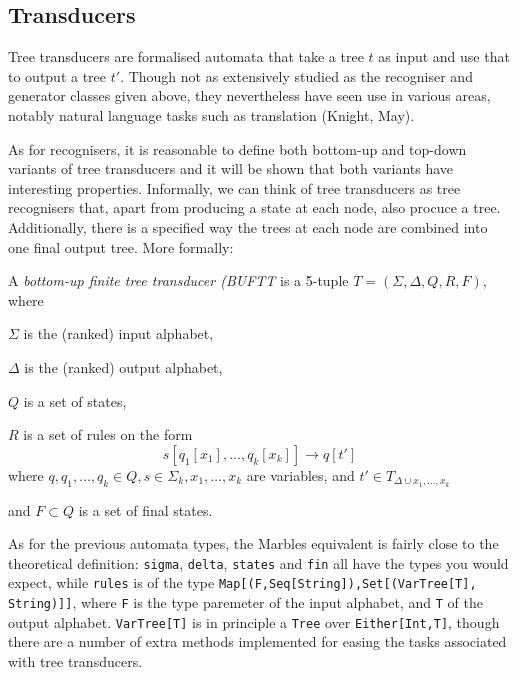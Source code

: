 
\subsection{Transducers}

Tree transducers are formalised automata that take a tree $t$ as input and
use that to output a tree $t'$. Though not as extensively studied as the
recogniser and generator classes given above, they nevertheless have seen
use in various areas, notably natural language tasks such as translation
(Knight, May). %

As for recognisers, it is reasonable to define both bottom-up and top-down
variants of tree transducers and it will be shown that both variants have
interesting properties. Informally, we can think of tree transducers as
tree recognisers that, apart from producing a state at each node, also
procuce a tree. Additionally, there is a specified way the trees at each
node are combined into one final output tree. More formally:

A \emph{bottom-up finite tree transducer (BUFTT} is a 5-tuple $T = (\Sigma,
\Delta, Q, R, F)$, where
\begin{compactitem}
\item $\Sigma$ is the (ranked) input alphabet,
\item $\Delta$ is the (ranked) output alphabet,
\item $Q$ is a set of states,
\item $R$ is a set of rules on the form
$$s[q_1[x_1],\ldots,q_k[x_k]] \rightarrow q[t']$$ where 
$q,q_1,\ldots,q_k \in Q, s \in \Sigma_k, x_1,\ldots,x_k$ are variables, and
$t' \in T_{\Delta \cup {x_1,\ldots,x_k}}$
\item and $F \subset Q$ is a set of final states.
\end{compactitem}

As for the previous automata types, the Marbles equivalent is fairly close
to the theoretical definition: \texttt{sigma}, \texttt{delta},
\texttt{states} and \texttt{fin} all have the types you would expect, while
\texttt{rules} is of the type \texttt{Map[(F,Seq[String]),Set[(VarTree[T],
  String)]]}, where \texttt{F} is the type paremeter of the input alphabet,
and \texttt{T} of the output alphabet. \texttt{VarTree[T]} is in principle
a \texttt{Tree} over \texttt{Either[Int,T]}, though there are a number of
extra methods implemented for easing the tasks associated with tree
transducers. 

